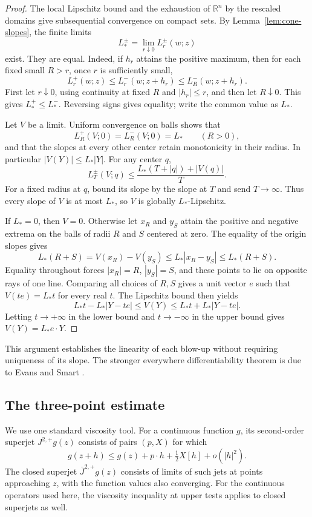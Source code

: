 \documentclass[11pt]{article}
\numberwithin{equation}{section}
\theoremstyle{definition}
\theoremstyle{remark}
\newcommand{\R}{\mathbb{R}}
\begin{document}
\begin{proof}
The local Lipschitz bound and the exhaustion of $\R^n$ by the rescaled domains give subsequential convergence on compact sets. By Lemma~\ref{lem:cone-slopes}, the finite limits
\[
  L_*^\pm=\lim_{r\downarrow0}L_r^\pm(w;z)
\]
exist. They are equal. Indeed, if $h_r$ attains the positive maximum, then for each fixed small $R>r$, once $r$ is sufficiently small,
\[
  L_r^+(w;z)\le L_r^-(w;z+h_r)\le L_R^-(w;z+h_r).
\]
First let $r\downarrow0$, using continuity at fixed $R$ and $|h_r|\le r$, and then let $R\downarrow0$. This gives $L_*^+\le L_*^-$. Reversing signs gives equality; write the common value as $L_*$.

Let $V$ be a limit. Uniform convergence on balls shows that
\[
  L_R^+(V;0)=L_R^-(V;0)=L_*\qquad(R>0),
\]
and that the slopes at every other center retain monotonicity in their radius. In particular $|V(Y)|\le L_*|Y|$. For any center $q$,
\[
  L_T^\pm(V;q)\le\frac{L_*(T+|q|)+|V(q)|}{T}.
\]
For a fixed radius at $q$, bound its slope by the slope at $T$ and send $T\to\infty$. Thus every slope of $V$ is at most $L_*$, so $V$ is globally $L_*$-Lipschitz.

If $L_*=0$, then $V=0$. Otherwise let $x_R$ and $y_S$ attain the positive and negative extrema on the balls of radii $R$ and $S$ centered at zero. The equality of the origin slopes gives
\[
  L_*(R+S)=V(x_R)-V(y_S)
     \le L_*|x_R-y_S|\le L_*(R+S).
\]
Equality throughout forces $|x_R|=R$, $|y_S|=S$, and these points to lie on opposite rays of one line. Comparing all choices of $R,S$ gives a unit vector $e$ such that $V(te)=L_*t$ for every real $t$. The Lipschitz bound then yields
\[
  L_*t-L_*|Y-te|\le V(Y)\le L_*t+L_*|Y-te|.
\]
Letting $t\to+\infty$ in the lower bound and $t\to-\infty$ in the upper bound gives $V(Y)=L_*e\cdot Y$.
\end{proof}

This argument establishes the linearity of each blow-up without requiring uniqueness of its slope. The stronger everywhere differentiability theorem is due to Evans and Smart \cite{EvansSmart2011}.

\subsection{The three-point estimate}

We use one standard viscosity tool. For a continuous function $g$, its second-order superjet $J^{2,+}g(z)$ consists of pairs $(p,X)$ for which
\[
  g(z+h)\le g(z)+p\cdot h+\tfrac12X[h]+o(|h|^2).
\]
The closed superjet $\overline J^{2,+}g(z)$ consists of limits of such jets at points approaching $z$, with the function values also converging. For the continuous operators used here, the viscosity inequality at upper tests applies to closed superjets as well.
\end{document}
